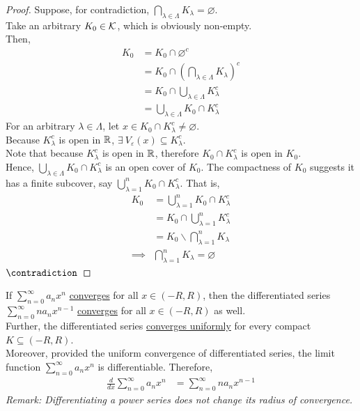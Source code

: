 \documentclass[11pt]{article}
\begin{document}
 	\begin{proof}
 		Suppose, for contradiction, $\bigcap_{\lambda \in \Lambda} K_\lambda = \varnothing$. \\
 		Take an arbitrary $K_0 \in \mathcal{{K}}$, which is obviously non-empty. \\
 		Then,
 		\begin{align}
 			K_0 &= K_0 \cap \varnothing^c \\
 			&= K_0 \cap \left(\bigcap_{\lambda \in \Lambda} K_\lambda\right)^c \\
 			&= K_0 \cap \bigcup_{\lambda \in \Lambda} K_\lambda^c \\
 			&= \bigcup_{\lambda \in \Lambda} K_0 \cap K_\lambda^c
 		\end{align}
 		For an arbitrary $\lambda \in \Lambda$, let $x \in K_0 \cap K_\lambda^c \neq \varnothing$. \\
 		Because $K_\lambda^c$ is open in $\mathbb{R}$, $\exists\ V_\varepsilon(x) \subseteq K_\lambda^c$. \\
 		Note that because $K_\lambda^c$ is open in $\mathbb{R}$, therefore $K_0 \cap K_\lambda^c$ is open in $K_0$. \\
 		Hence, $\bigcup_{\lambda \in \Lambda} K_0 \cap K_\lambda^c$ is an open cover of $K_0$. The compactness of $K_0$ suggests it has a finite subcover, say $\bigcup_{\lambda=1}^n K_0 \cap K_\lambda^c$. That is,
 		\begin{align}
 			K_0 &= \bigcup_{\lambda=1}^n K_0 \cap K_\lambda^c \\
 			&= K_0 \cap \bigcup_{\lambda=1}^n K_\lambda^c \\
 			&= K_0 \backslash \bigcap_{\lambda=1}^n K_\lambda \\
 			\implies &\bigcap_{\lambda=1}^n K_\lambda = \varnothing
 		\end{align}
 		$\contradiction$
 	\end{proof}
 	
 	\begin{theorem}
 		If $\sum_{n=0}^\infty a_n x^n$ \ul{converges} for all $x \in (-R, R)$, then the differentiated series $\sum_{n=0}^\infty n a_n x^{n-1}$ \ul{converges} for all $x \in (-R, R)$ as well. \\
 		Further, the differentiated series \ul{converges uniformly} for every compact $K \subseteq (-R, R)$. \\
 		Moreover, provided the uniform convergence of differentiated series, the limit function $\sum_{n=0}^\infty a_n x^n$ is differentiable. Therefore,
 		\begin{align}
 			\frac{d}{dx} \sum_{n=0}^\infty a_n x^n &= \sum_{n=0}^\infty n a_n x^{n-1}
 		\end{align}
 		\emph{Remark: Differentiating a power series does not change its radius of convergence.}
 	\end{theorem}
 	
\end{document}
